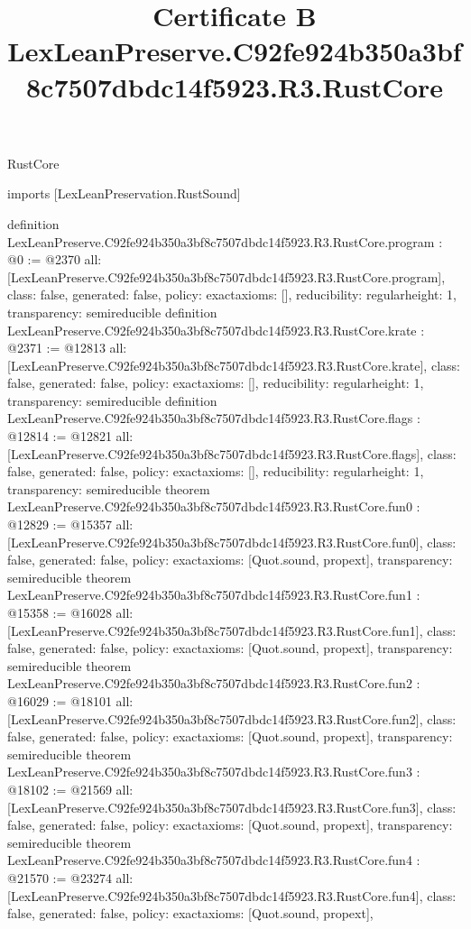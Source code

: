 \begin{lexlean}{RustCore}
\title{Certificate B LexLeanPreserve.C92fe924b350a3bf8c7507dbdc14f5923.R3.RustCore}
\begin{coremodule}
imports [LexLeanPreservation.RustSound]

definition LexLeanPreserve.C92fe924b350a3bf8c7507dbdc14f5923.R3.RustCore.program : @0 := @2370 {
  all: [LexLeanPreserve.C92fe924b350a3bf8c7507dbdc14f5923.R3.RustCore.program],
  class: false,
  generated: false,
  policy: exact{axioms: []},
  reducibility: regular{height: 1},
  transparency: semireducible
}
definition LexLeanPreserve.C92fe924b350a3bf8c7507dbdc14f5923.R3.RustCore.krate : @2371 := @12813 {
  all: [LexLeanPreserve.C92fe924b350a3bf8c7507dbdc14f5923.R3.RustCore.krate],
  class: false,
  generated: false,
  policy: exact{axioms: []},
  reducibility: regular{height: 1},
  transparency: semireducible
}
definition LexLeanPreserve.C92fe924b350a3bf8c7507dbdc14f5923.R3.RustCore.flags : @12814 := @12821 {
  all: [LexLeanPreserve.C92fe924b350a3bf8c7507dbdc14f5923.R3.RustCore.flags],
  class: false,
  generated: false,
  policy: exact{axioms: []},
  reducibility: regular{height: 1},
  transparency: semireducible
}
theorem LexLeanPreserve.C92fe924b350a3bf8c7507dbdc14f5923.R3.RustCore.fun0 : @12829 := @15357 {
  all: [LexLeanPreserve.C92fe924b350a3bf8c7507dbdc14f5923.R3.RustCore.fun0],
  class: false,
  generated: false,
  policy: exact{axioms: [Quot.sound, propext]},
  transparency: semireducible
}
theorem LexLeanPreserve.C92fe924b350a3bf8c7507dbdc14f5923.R3.RustCore.fun1 : @15358 := @16028 {
  all: [LexLeanPreserve.C92fe924b350a3bf8c7507dbdc14f5923.R3.RustCore.fun1],
  class: false,
  generated: false,
  policy: exact{axioms: [Quot.sound, propext]},
  transparency: semireducible
}
theorem LexLeanPreserve.C92fe924b350a3bf8c7507dbdc14f5923.R3.RustCore.fun2 : @16029 := @18101 {
  all: [LexLeanPreserve.C92fe924b350a3bf8c7507dbdc14f5923.R3.RustCore.fun2],
  class: false,
  generated: false,
  policy: exact{axioms: [Quot.sound, propext]},
  transparency: semireducible
}
theorem LexLeanPreserve.C92fe924b350a3bf8c7507dbdc14f5923.R3.RustCore.fun3 : @18102 := @21569 {
  all: [LexLeanPreserve.C92fe924b350a3bf8c7507dbdc14f5923.R3.RustCore.fun3],
  class: false,
  generated: false,
  policy: exact{axioms: [Quot.sound, propext]},
  transparency: semireducible
}
theorem LexLeanPreserve.C92fe924b350a3bf8c7507dbdc14f5923.R3.RustCore.fun4 : @21570 := @23274 {
  all: [LexLeanPreserve.C92fe924b350a3bf8c7507dbdc14f5923.R3.RustCore.fun4],
  class: false,
  generated: false,
  policy: exact{axioms: [Quot.sound, propext]},
}
\end{coremodule}
\end{lexlean}
